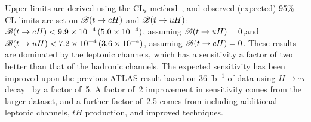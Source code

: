 Upper limits are derived using the CL$_{\textrm{s}}$ method~\cite{Junk:1999kv,Read:2002hq}, and  
observed (expected) 95\% CL limits are set on $\mathscr{B}(t\to cH)$ and $\mathscr{B}(t\to uH)$:
$\mathscr{B}(t\to cH)<9.9 \times 10^{-4}\,(5.0 \times 10^{-4})$, assuming $\mathscr{B}(t\to uH)=0$,and $\mathscr{B}(t\to uH)<7.2 \times 10^{-4}\,(3.6 \times 10^{-4})$, assuming $\mathscr{B}(t\to cH)=0$.
These results are dominated by the leptonic channels, which has a sensitivity a factor of two better than that of the hadronic channels.
The expected sensitivity has been improved upon the previous ATLAS result based on 36 fb$^{-1}$ of data using $H\to \tau\tau$ decay~\cite{fcnc36} by a factor of~5. A factor of~2 improvement in sensitivity comes from the larger dataset, and a further factor of~2.5 comes from including
additional leptonic channels, $tH$ production, and improved techniques.

